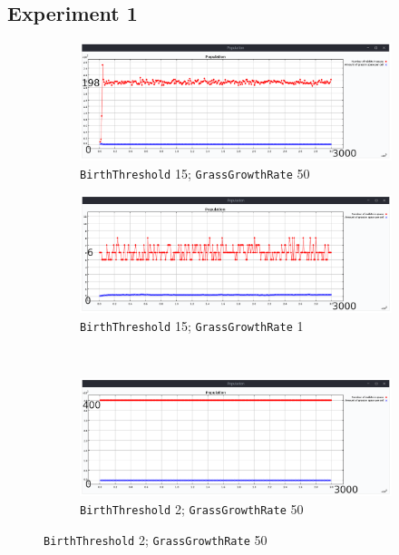 \documentclass[11pt]{article}
\begin{document}
\subsection{Experiment 1}
\begin{figure}[h!]
    \begin{subfigure}{.5\textwidth}
        \centering
        \includegraphics[width=.95\linewidth]{intro_rabbits/plot15_50.png}
        \caption{\texttt{BirthThreshold} 15; \texttt{GrassGrowthRate} 50}
        \label{fig:plot15-50}
    \end{subfigure}
    \hfill
    \begin{subfigure}{.5\textwidth}
        \centering
        \includegraphics[width=.95\linewidth]{intro_rabbits/plot15_1.png}
        \caption{\texttt{BirthThreshold} 15; \texttt{GrassGrowthRate} 1}
        \label{fig:plot15-1}
    \end{subfigure}\\%
    \begin{subfigure}{.5\textwidth}
        \centering
        \includegraphics[width=.95\linewidth]{intro_rabbits/plot2_1.png}
        \caption{\texttt{BirthThreshold} 2; \texttt{GrassGrowthRate} 50}

\end{subfigure}
\end{figure}
\end{document}
